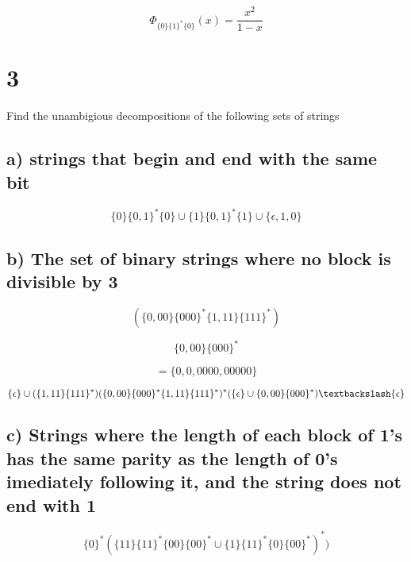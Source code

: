 \documentclass[12pt]{article}
\begin{document}
	$$\Phi_{\{0\}\{1\}^*\{0\}}(x) = \frac{x^2}{1-x}$$
	
	\section*{3}
	Find the unambigious decompositions of the following sets of strings\\
	
	\subsection*{a) strings that begin and end with the same bit}
	$$\{0\}\{0,1\}^*\{0\} \cup \{1\}\{0,1\}^*\{1\} \cup \{\epsilon,1 ,0 \}$$
	
	\subsection*{b) The set of binary strings where no block is divisible by 3}
	
	$$(\{0,00\}\{000\}^*\{1,11\}\{111\}^*)$$
	
	$$\{0,00\}\{000\}^*$$
	
	$$= \{0, 0, 0000, 00000\}$$
	
	$$\{\epsilon \} \cup (\{1,11\}\{111\}^*)(\{0,00\}\{000\}^*\{1,11\}\{111\}^*)^*(\{\epsilon \} \cup \{0,00\}\{000\}^*) \textbackslash \{\epsilon \}$$
	
	\subsection*{c) Strings where the length of each block of 1's has the same parity as the length of 0's imediately following it, and the string does not end with 1}
	
	$$\{0\}^*(\{11\} \{11\}^*\{00\}\{00\}^* \cup \{1\}\{11\}^*\{0\}\{00\}^*)^*)$$
	
	
	
	
\end{document}

